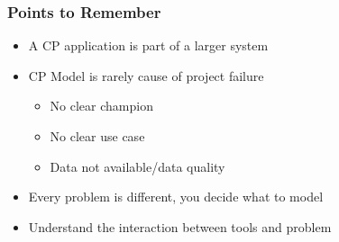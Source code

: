 \begin{frame}
\frametitle{Points to Remember}
\begin{itemize}
\item A CP application is part of a larger system
\item CP Model is rarely cause of project failure
  \begin{itemize}
  \item No clear champion
  \item No clear use case
  \item Data not available/data quality    
  \end{itemize}
\item Every problem is different, you decide what to model
  \item Understand the interaction between tools and problem
\end{itemize}
\end{frame}

